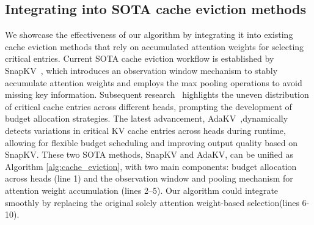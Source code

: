 \subsection{Integrating into SOTA cache eviction methods}
\label{sc:integration}
We showcase the effectiveness of our algorithm by integrating it into existing cache eviction methods that rely on accumulated attention weights for selecting critical entries.
Current SOTA cache eviction workflow is established by SnapKV~\cite{SnapKV}, which introduces an observation window mechanism to stably accumulate attention weights and employs the max pooling operations to avoid missing key information.
 Subsequent research~\cite{pyramidkv,ada} highlights the uneven distribution of critical cache entries across different heads, prompting the development of budget allocation strategies.
 The latest advancement, AdaKV~\cite{ada},dynamically detects variations in critical KV cache entries across heads during runtime, allowing for flexible budget scheduling and improving output quality based on SnapKV.
 These two SOTA methods, SnapKV and AdaKV, can be unified as Algorithm \ref{alg:cache_eviction}, with two main components: budget allocation across heads (line 1) and the observation window and pooling mechanism for attention weight accumulation (lines 2–5).
 Our algorithm could integrate smoothly by replacing the original solely attention weight-based selection(lines 6-10).


